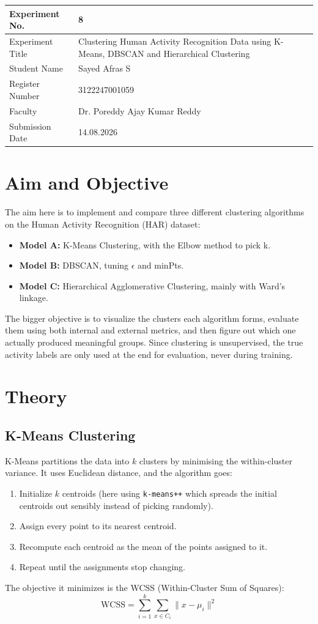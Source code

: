 \documentclass[12pt,a4paper]{article}
\begin{document}
\begin{tabular}{|p{4cm}|p{11cm}|}
\hline
Experiment No. & 8 \\ \hline
Experiment Title & Clustering Human Activity Recognition Data using K-Means, DBSCAN and Hierarchical Clustering \\ \hline
Student Name & Sayed Afras S \\ \hline
Register Number & 3122247001059 \\ \hline
Faculty & Dr. Poreddy Ajay Kumar Reddy \\ \hline
Submission Date & 14.08.2026 \\ \hline
\end{tabular}

\section{Aim and Objective}
The aim here is to implement and compare three different clustering algorithms on the Human Activity Recognition (HAR) dataset:
\begin{itemize}
\item \textbf{Model A:} K-Means Clustering, with the Elbow method to pick k.
\item \textbf{Model B:} DBSCAN, tuning $\epsilon$ and minPts.
\item \textbf{Model C:} Hierarchical Agglomerative Clustering, mainly with Ward's linkage.
\end{itemize}
The bigger objective is to visualize the clusters each algorithm forms, evaluate them using both internal and external metrics, and then figure out which one actually produced meaningful groups. Since clustering is unsupervised, the true activity labels are only used at the end for evaluation, never during training.

\section{Theory}

\subsection*{K-Means Clustering}
K-Means partitions the data into $k$ clusters by minimising the within-cluster variance. It uses Euclidean distance, and the algorithm goes:
\begin{enumerate}
\item Initialize $k$ centroids (here using \texttt{k-means++} which spreads the initial centroids out sensibly instead of picking randomly).
\item Assign every point to its nearest centroid.
\item Recompute each centroid as the mean of the points assigned to it.
\item Repeat until the assignments stop changing.
\end{enumerate}
The objective it minimizes is the WCSS (Within-Cluster Sum of Squares):
\[
\text{WCSS} = \sum_{i=1}^{k}\sum_{x \in C_i} \|x - \mu_i\|^2
\]
\end{document}
